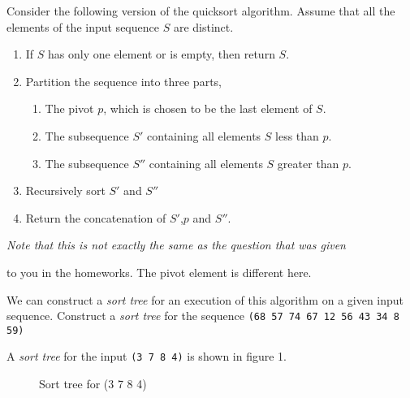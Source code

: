 Consider the following version of the quicksort algorithm. Assume that
all the elements of the input sequence $S$ are distinct.

\begin{enumerate}
\item  If $S$ has only one element or is empty, then return $S$.
\item  Partition the sequence into three parts, 
\begin{enumerate}
\item  The pivot $p$, which is chosen to be the last element of $S$.
\item  The subsequence $S'$ containing all elements $S$ less than $p$.
\item  The subsequence $S''$ containing all elements $S$ greater than $p$.
\end{enumerate}
\item  Recursively sort $S'$ and $S''$
\item  Return the concatenation of $S'$,$p$ and $S''$.
\end{enumerate}

{\it Note that this is not exactly the same as the question that was given

to you in the homeworks. The pivot element is different here.}

We can construct a {\it sort tree} for an execution of this algorithm
on a given input sequence. Construct a {\it sort tree} for the
sequence {\tt (68 57 74 67 12 56 43 34 8 59)}

A {\it sort tree} for the input {\tt (3 7 8 4)} is shown in figure 1.

\begin{figure}[ht]
\centerline{}
\caption{Sort tree for (3 7 8 4)}
\end{figure}



